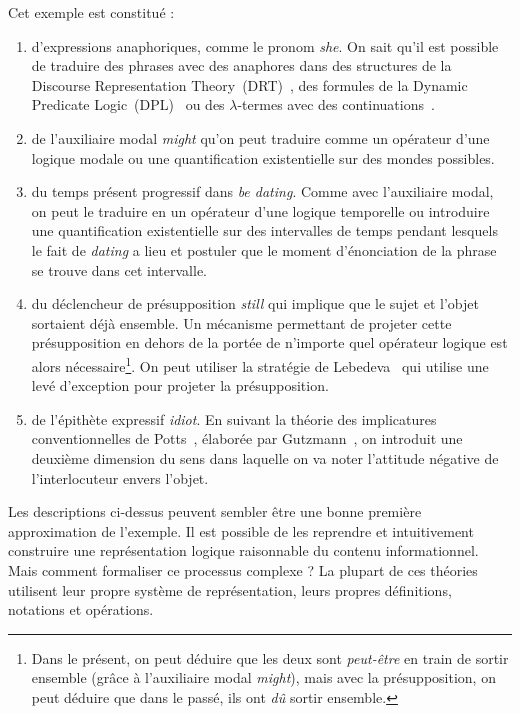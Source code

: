 Cet exemple est constitué :
\begin{enumerate}
  \item \label{item:french-first-feature} d'expressions anaphoriques, comme
    le pronom \emph{she}. On sait qu'il est possible de traduire des phrases avec des anaphores
    dans des structures de la Discourse Representation
    Theory~(DRT)~\cite{kamp1993discourse}, des formules de la Dynamic Predicate
    Logic~(DPL)~\cite{groenendijk1991dynamic} ou des $\lambda$-termes avec des
     continuations~\cite{de2006towards}.
  \item de l'auxiliaire modal \emph{might} qu'on peut traduire comme un
    opérateur d'une logique modale ou une quantification existentielle sur des
    mondes possibles.
  \item du temps présent progressif dans \emph{be dating}. Comme avec
    l'auxiliaire modal, on peut le traduire en un opérateur d'une logique
    temporelle ou introduire une quantification existentielle sur des
    intervalles de temps pendant lesquels le fait de \emph{dating} a lieu et postuler
    que le moment d'énonciation de la phrase se trouve dans cet intervalle.
  \item du déclencheur de présupposition \emph{still} qui implique que le
    sujet et l'objet sortaient déjà ensemble. Un mécanisme permettant de projeter 
    cette présupposition en dehors de
    la portée de n'importe quel opérateur logique est alors nécessaire\footnote{Dans le présent, 
    on peut déduire que les deux sont \emph{peut-être} en train de sortir
      ensemble (grâce à l'auxiliaire modal \emph{might}), mais avec la
      présupposition, on peut déduire que dans le passé, ils ont \emph{dû}
      sortir ensemble.}. On peut utiliser la stratégie de
    Lebedeva~\cite{lebedeva2012expression} qui utilise une levé d'exception pour projeter
    la présupposition.
  \item \label{item:french-last-feature} de l'épithète expressif \emph{idiot}.
    En suivant la théorie des implicatures conventionnelles de
    Potts~\cite{potts2005logic}, élaborée par Gutzmann~\cite{gutzmann2015use},
    on introduit une deuxième dimension du sens dans laquelle on va noter
    l'attitude négative de l'interlocuteur envers l'objet.
\end{enumerate}

Les descriptions ci-dessus peuvent sembler être une bonne première approximation de 
l'exemple. Il est possible de les reprendre et intuitivement construire une représentation 
logique raisonnable du contenu informationnel. Mais comment formaliser ce processus 
complexe ? La plupart de ces théories utilisent leur propre système de représentation, leurs propres
définitions, notations et opérations.

